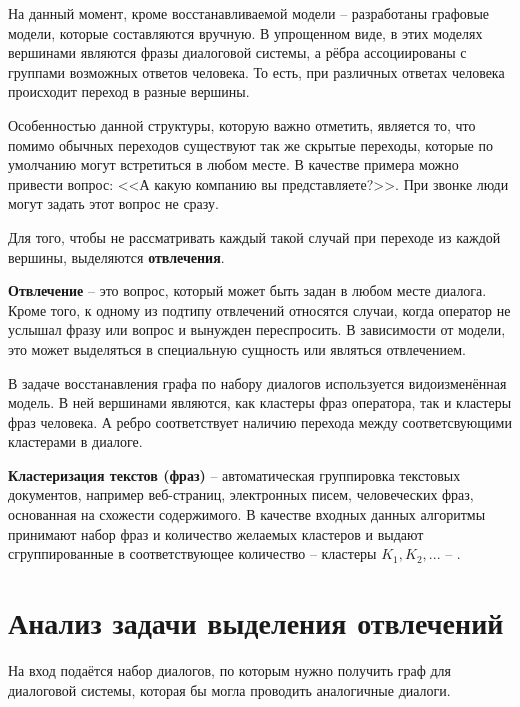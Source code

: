 \documentclass[times,specification,annotation]{itmo-student-thesis}
\begin{document}
	
	На данный момент, кроме восстанавливаемой модели -- разработаны графовые модели, которые составляются вручную. В упрощенном виде, в этих моделях вершинами являются фразы диалоговой системы, а рёбра ассоциированы с группами возможных ответов человека. То есть, при различных ответах человека происходит переход в разные вершины.%
	
	Особенностью данной структуры, которую важно отметить, является то, что помимо обычных переходов существуют так же скрытые переходы, которые по умолчанию могут встретиться в любом месте. В качестве примера можно привести вопрос: <<А какую компанию вы представляете?>>. При звонке люди могут задать этот вопрос не сразу.
	
	Для того, чтобы не рассматривать каждый такой случай при переходе из каждой вершины, выделяются \textbf{отвлечения}.
	
	\textbf{Отвлечение} -- это вопрос, который может быть задан в любом месте диалога. Кроме того, к одному из подтипу отвлечений относятся случаи, когда оператор не услышал фразу или вопрос и вынужден переспросить. В зависимости от модели, это может выделяться в специальную сущность или являться отвлечением.
	
	В задаче восстанавления графа по набору диалогов используется видоизменённая модель. В ней вершинами являются, как кластеры фраз оператора, так и кластеры фраз человека. А ребро соответствует наличию перехода между соответсвующими кластерами в диалоге.
	
	\textbf{Кластеризация текстов (фраз)} -- автоматическая группировка текстовых документов, например веб-страниц, электронных писем, человеческих фраз, основанная на схожести содержимого. В качестве входных данных алгоритмы принимают набор фраз и количество желаемых кластеров и выдают сгруппированные в соответствующее количество -- кластеры $K_1, K_2, ...$ -- \cite{Li2009}.
	
	\section{Анализ задачи выделения отвлечений}%
	На вход подаётся набор диалогов, по которым нужно получить граф для диалоговой системы, которая бы могла проводить аналогичные диалоги.
	
\end{document}

